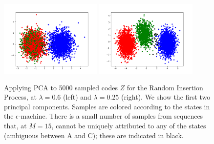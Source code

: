 \documentclass[entropy,article,submit,moreauthors,pdftex,10pt,a4paper]{Definitions/mdpi}
\begin{document}
\begin{figure}
\includegraphics[width=0.45\textwidth]{code/figures/foo_pca_2.png}
\includegraphics[width=0.45\textwidth]{code/figures/foo_pca_3.png}
	\caption{Applying PCA to 5000 sampled codes $Z$ for the Random Insertion Process, at $\lambda = 0.6$ (left) and $\lambda = 0.25$ (right). We show the first two principal components. Samples are colored according to the states in the $\epsilon$-machine. There is a small number of samples from sequences that, at $M=15$, cannot be uniquely attributed to any of the states (ambiguous between A and C); these are indicated in black.}\label{fig:latent}
\end{figure}
\end{document}
